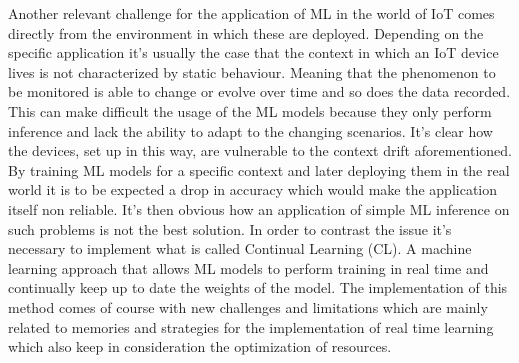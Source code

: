 \documentclass[12pt]{report}
\begin{document}
Another relevant challenge for the application of ML in the world of IoT comes directly from the environment in which these are deployed. Depending on the specific application it's usually the case that the context in which an IoT device lives is not characterized by static behaviour. Meaning that the phenomenon to be monitored is able to change or evolve over time and so does the data recorded. This can make difficult the usage of the ML models because they only perform inference and lack the ability to adapt to the changing scenarios. It's clear how the devices, set up in this way, are vulnerable to the context drift aforementioned. 
By training ML models for a specific context and later deploying them in the real world it is to be expected a drop in accuracy which would make the application itself non reliable. It's then obvious how an application of simple ML inference on such problems is not the best solution. In order to contrast the issue it's necessary to implement what is called Continual Learning (CL). A machine learning approach that allows ML models to perform training in real time and continually keep up to date the weights of the model. The implementation of this method comes of course with new challenges and limitations which are mainly related to memories and strategies for the implementation of real time learning which also keep in consideration the optimization of resources.
\bigskip
\end{document}
